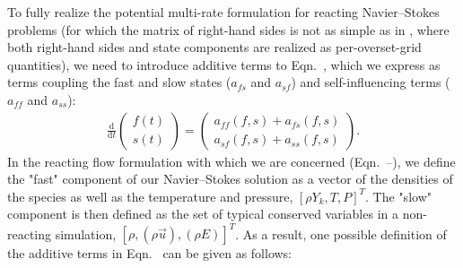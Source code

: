 To fully realize the potential multi-rate formulation for reacting
Navier--Stokes problems (for which the matrix of right-hand sides is
not as simple as in \cite{mikida2019multi}, where both right-hand sides
and state components are realized as per-overset-grid quantities),
we need to introduce additive terms to Eqn.~, which we express
as terms coupling the fast and slow states ($a_{fs}$ and $a_{sf}$) and
self-influencing terms ($a_{ff}$ and $a_{ss}$):
\begin{align}
\frac{\textrm{d}}{\textrm{d}t}\left( \begin{array}{c} f(t) \\ s(t) \end{array} \right) = \left( \begin{array}{c} a_{ff}(f,s) + a_{fs}(f,s) \\ a_{sf}(f,s) + a_{ss}(f,s) \end{array} \right). \label{eq:mr_reacting}
\end{align}
In the reacting flow formulation with which we are concerned (Eqn.~--), we define
the "fast" component of our Navier--Stokes solution as a vector of the
densities of the species as well as the temperature and pressure, $[\rho Y_{k}, T, P]^T$.
The "slow" component is then defined as the set of typical conserved variables in a
non-reacting simulation, $[\rho, (\rho \vec{u}), (\rho E)]^T$. As
a result, one possible definition of the additive terms in Eqn.~ can be given as follows:
